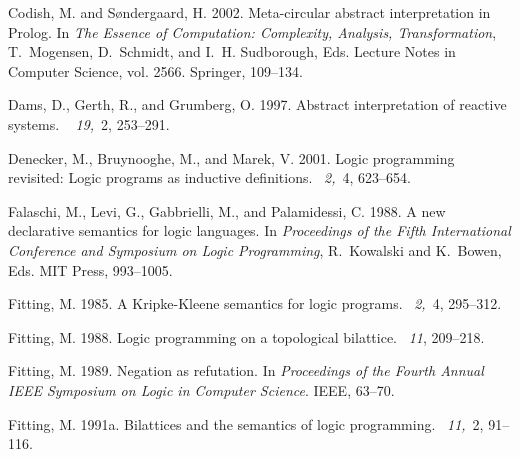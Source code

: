 \documentclass{tlp}
\begin{document}
\begin{thebibliography}{}
{\sc Codish, M.} {\sc and} {\sc S{\o}ndergaard, H.} 2002.
\newblock Meta-circular abstract interpretation in {Prolog}.
\newblock In {\em The Essence of Computation: Complexity, Analysis,
  Transformation}, {T.~Mogensen}, {D.~Schmidt}, {and} {I.~H. Sudborough}, Eds.
  Lecture Notes in Computer Science, vol. 2566. Springer, 109--134.

{\sc Dams, D.}, {\sc Gerth, R.}, {\sc and} {\sc Grumberg, O.} 1997.
\newblock Abstract interpretation of reactive systems.
~{\em
  19,\/}~2, 253--291.

{\sc Denecker, M.}, {\sc Bruynooghe, M.}, {\sc and} {\sc Marek, V.} 2001.
\newblock Logic programming revisited: Logic programs as inductive definitions.
~{\em 2,\/}~4,
  623--654.

{\sc Falaschi, M.}, {\sc Levi, G.}, {\sc Gabbrielli, M.}, {\sc and} {\sc
  Palamidessi, C.} 1988.
\newblock A new declarative semantics for logic languages.
\newblock In {\em Proceedings of the Fifth International Conference and
  Symposium on Logic Programming}, {R.~Kowalski} {and} {K.~Bowen}, Eds. MIT
  Press, 993--1005.

{\sc Fitting, M.} 1985.
\newblock A {Kripke-Kleene} semantics for logic programs.
~{\em 2,\/}~4, 295--312.

{\sc Fitting, M.} 1988.
\newblock Logic programming on a topological bilattice.
~{\em 11}, 209--218.

{\sc Fitting, M.} 1989.
\newblock Negation as refutation.
\newblock In {\em Proceedings of the Fourth Annual IEEE Symposium on Logic in
  Computer Science}. IEEE, 63--70.

{\sc Fitting, M.} 1991a.
\newblock Bilattices and the semantics of logic programming.
~{\em 11,\/}~2, 91--116.


\end{thebibliography}
\end{document}
